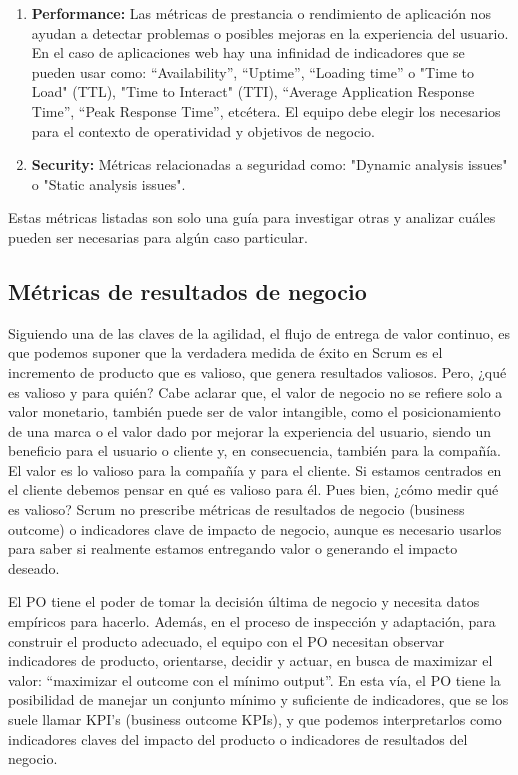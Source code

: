 \begin{enumerate}
  \item {\textbf{Performance:}
Las métricas de prestancia o rendimiento de aplicación nos ayudan a detectar problemas o posibles mejoras en la experiencia del usuario. En el caso de aplicaciones web hay una infinidad de indicadores que se pueden usar como: “Availability”, “Uptime”, “Loading time” o "Time to Load" (TTL), "Time to Interact" (TTI), “Average Application Response Time”, “Peak Response Time”, etcétera. El equipo debe elegir los necesarios para el contexto de operatividad y objetivos de negocio.
}

  \item {\textbf{Security:}
  Métricas relacionadas a seguridad como: "Dynamic analysis issues" o "Static analysis issues".
}

  \end{enumerate}

Estas métricas listadas son solo una guía para investigar otras y analizar cuáles pueden ser necesarias para algún caso particular.

\subsection{Métricas de resultados de negocio}

Siguiendo una de las claves de la agilidad, el flujo de entrega de valor continuo, es que podemos suponer que la verdadera medida de éxito en Scrum es el incremento de producto que es valioso, que genera resultados valiosos. Pero, ¿qué es valioso y para quién? Cabe aclarar que, el valor de negocio no se refiere solo a valor monetario, también puede ser de valor intangible, como el posicionamiento de una marca o el valor dado por mejorar la experiencia del usuario, siendo un beneficio para el usuario o cliente y, en consecuencia, también para la compañía. El valor es lo valioso para la compañía y para el cliente. Si estamos centrados en el cliente debemos pensar en qué es valioso para él. Pues bien, ¿cómo medir qué es valioso?
Scrum no prescribe métricas de resultados de negocio (business outcome) o indicadores clave de impacto de negocio, aunque es necesario usarlos para saber si realmente estamos entregando valor o generando el impacto deseado. 

El PO tiene el poder de tomar la decisión última de negocio y necesita datos empíricos para hacerlo. Además, en el proceso de inspección y adaptación, para construir el producto adecuado, el equipo con el PO necesitan observar indicadores de producto, orientarse, decidir y actuar, en busca de maximizar el valor: “maximizar el outcome con el mínimo output”. En esta vía, el PO tiene la posibilidad de manejar un conjunto mínimo y suficiente de indicadores, que se los suele llamar KPI's (business outcome KPIs), y que podemos interpretarlos como indicadores claves del impacto del producto o indicadores de resultados del negocio.

